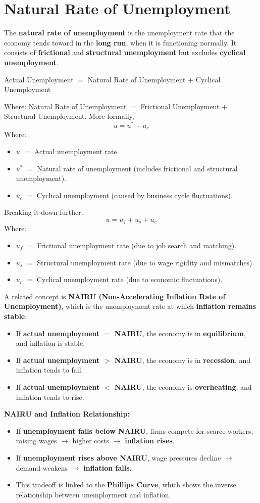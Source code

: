 \documentclass[a4paper, 11pt]{article}
\begin{document}
\section{Natural Rate of Unemployment}
The \textbf{natural rate of unemployment} is the unemployment rate that the economy tends toward in the \textbf{long run}, when it is functioning normally. It consists of \textbf{frictional} and \textbf{structural unemployment} but excludes \textbf{cyclical unemployment}.
\begin{center}
    Actual Unemployment $=$ Natural Rate of Unemployment $+$ Cyclical Unemployment
\end{center}
Where: Natural Rate of Unemployment $=$ Frictional Unemployment $+$ Structural Unemployment.
More formally,
\[ u=u^*+u_c \]
Where:
\begin{itemize}
    \item $u$ $=$ Actual unemployment rate.
    \item $u^*$ $=$ Natural rate of unemployment (includes frictional and structural unemployment).
    \item $u_c$ $=$ Cyclical unemployment (caused by business cycle fluctuations).
\end{itemize}
Breaking it down further:
\[ u=u_f+u_s+u_c \]
Where:
\begin{itemize}
    \item $u_f$ $=$ Frictional unemployment rate (due to job search and matching).
    \item $u_s$ $=$ Structural unemployment rate (due to wage rigidity and mismatches).
    \item $u_c$ $=$ Cyclical unemployment rate (due to economic fluctuations).
\end{itemize}
A related concept is \textbf{NAIRU (Non-Accelerating Inflation Rate of Unemployment)}, which is the unemployment rate at which \textbf{inflation remains stable}.
\begin{itemize}
    \item If \textbf{actual unemployment $=$ NAIRU}, the economy is in \textbf{equilibrium}, and inflation is stable.
    \item If \textbf{actual unemployment $>$ NAIRU}, the economy is in \textbf{recession}, and inflation tends to fall.
    \item If \textbf{actual unemployment $<$ NAIRU}, the economy is \textbf{overheating}, and inflation tends to rise.
\end{itemize}
\textbf{NAIRU and Inflation Relationship:}
\begin{itemize}
    \item If \textbf{unemployment falls below NAIRU}, firms compete for scarce workers, raising wages $\rightarrow$ higher costs $\rightarrow$ \textbf{inflation rises}.
    \item If \textbf{unemployment rises above NAIRU}, wage pressures decline $\rightarrow$ demand weakens $\rightarrow$ \textbf{inflation falls}.
    \item This tradeoff is linked to the \textbf{Phillips Curve}, which shows the inverse relationship between unemployment and inflation.
\end{itemize}
\end{document}
